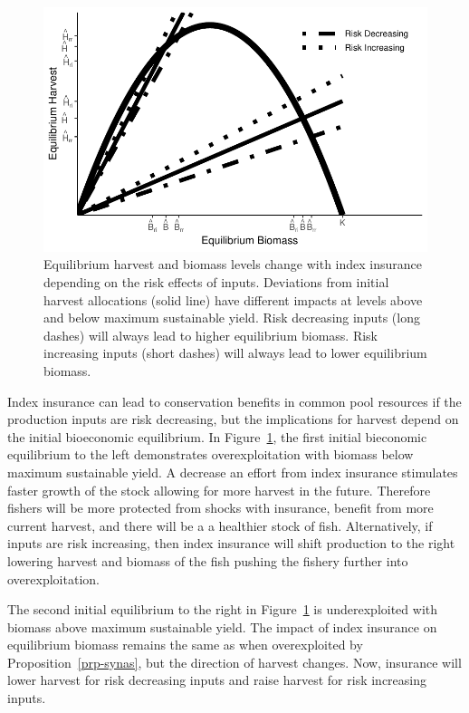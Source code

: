 \documentclass[
  letterpaper,
  DIV=11,
  numbers=noendperiod]{scrartcl}
\theoremstyle{plain}
\theoremstyle{plain}
\theoremstyle{remark}
\begin{document}
\begin{figure}

{\centering \includegraphics{ibi-behavior_files/figure-pdf/fig-synas-1.pdf}

}

\caption{\label{fig-synas}Equilibrium harvest and biomass levels change
with index insurance depending on the risk effects of inputs. Deviations
from initial harvest allocations (solid line) have different impacts at
levels above and below maximum sustainable yield. Risk decreasing inputs
(long dashes) will always lead to higher equilibrium biomass. Risk
increasing inputs (short dashes) will always lead to lower equilibrium
biomass.}

\end{figure}

Index insurance can lead to conservation benefits in common pool
resources if the production inputs are risk decreasing, but the
implications for harvest depend on the initial bioeconomic equilibrium.
In Figure~\ref{fig-synas}, the first initial bieconomic equilibrium to
the left demonstrates overexploitation with biomass below maximum
sustainable yield. A decrease an effort from index insurance stimulates
faster growth of the stock allowing for more harvest in the future.
Therefore fishers will be more protected from shocks with insurance,
benefit from more current harvest, and there will be a a healthier stock
of fish. Alternatively, if inputs are risk increasing, then index
insurance will shift production to the right lowering harvest and
biomass of the fish pushing the fishery further into overexploitation.

The second initial equilibrium to the right in Figure~\ref{fig-synas} is
underexploited with biomass above maximum sustainable yield. The impact
of index insurance on equilibrium biomass remains the same as when
overexploited by Proposition~\ref{prp-synas}, but the direction of
harvest changes. Now, insurance will lower harvest for risk decreasing
inputs and raise harvest for risk increasing inputs.
\end{document}
